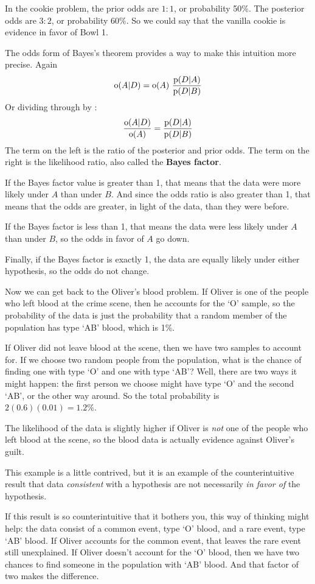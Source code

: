 \documentclass[12pt]{book}
\begin{document}
In the cookie problem, the prior odds are $1:1$, or probability 50\%.
The posterior odds are $3:2$, or probability 60\%.  So we could say
that the vanilla cookie is evidence in favor of Bowl 1.

The odds form of Bayes's theorem provides a way to make this
intuition more precise.  Again
%
\[ \mathrm{o}(A|D) = \mathrm{o}(A)~\frac{\mathrm{p}(D|A)}{\mathrm{p}(D|B)} \]
%
Or dividing through by :
%
\[ \frac{\mathrm{o}(A|D)}{\mathrm{o}(A)} = \frac{\mathrm{p}(D|A)}{\mathrm{p}(D|B)} \]
%
The term on the left is the ratio of the posterior and prior odds.
The term on the right is the likelihood ratio, also called the {\bf Bayes
factor}.

If the Bayes factor value is greater than 1, that means that the
data were more likely under $A$ than under $B$.  And since the
odds ratio is also greater than 1, that means that the odds are
greater, in light of the data, than they were before.

If the Bayes factor is less than 1, that means the data were
less likely under $A$ than under $B$, so the odds in
favor of $A$ go down.

Finally, if the Bayes factor is exactly 1, the data are equally
likely under either hypothesis, so the odds do not change.

Now we can get back to the Oliver's blood problem.  If Oliver is
one of the people who left blood at the crime scene, then he
accounts for the `O' sample, so the probability of the data
is just the probability that a random member of the population
has type `AB' blood, which is 1\%.

If Oliver did not leave blood at the scene, then we have two
samples to account for.  If we choose two random people from
the population, what is the chance of finding one with type `O'
and one with type `AB'?  Well, there are two ways it might happen:
the first person we choose might have type `O' and the second
`AB', or the other way around.  So the total probability is
$2 (0.6) (0.01) = 1.2\%$.

The likelihood of the data is slightly higher if Oliver is
{\it not} one of the people who left blood at the scene, so
the blood data is actually evidence against Oliver's guilt.

This example is a little contrived, but it is an example of
the counterintuitive result that data {\it consistent} with
a hypothesis are not necessarily {\it in favor of}
the hypothesis.

If this result is so counterintuitive that it bothers you,
this way of thinking might help: the data consist of a common
event, type `O' blood, and a rare event, type `AB' blood.
If Oliver accounts for the common event, that leaves the rare
event still unexplained.  If Oliver doesn't account for the
`O' blood, then we have two chances to find someone in the
population with `AB' blood.  And that factor of two makes
the difference.
\end{document}
